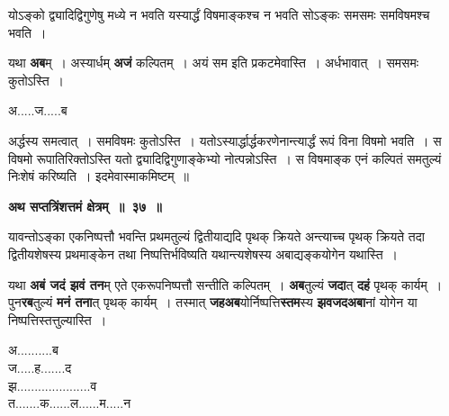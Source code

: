 \documentclass[11pt, openany]{book}
\begin{document}
 {\ab योऽङ्को द्व्यादिद्विगुणेषु मध्ये न भवति यस्यार्द्धं विषमाङ्कश्च न भवति सोऽङ्कः समसमः समविषमश्च भवति~।} 

\newpage
\begin{flushleft}
\begin{minipage}[t]{0.65\textwidth}
\hspace{4mm}  यथा \textbf{अब}म्~। अस्यार्धम् \textbf{अजं} कल्पितम्~। अयं सम इति प्रकटमेवास्ति~। अर्धभावात्~। समसमः कुतोऽस्ति~।
\end{minipage} 
\hfill
\begin{minipage}[t]{0.25\textwidth}
अ.....ज.....ब
\end{minipage}
\end{flushleft}
\vspace{-3mm}
 
\noindent  अर्द्धस्य समत्वात्~। समविषमः कुतोऽस्ति~। यतोऽस्यार्द्धार्द्धकरणेनान्त्यार्द्धं रूपं विना विषमो भवति~। स विषमो रूपातिरिक्तोऽस्ति  यतो द्व्यादिद्विगुणाङ्केभ्यो नोत्पन्नोऽस्ति~। स विषमाङ्क एनं कल्पितं समतुल्यं निःशेषं करिष्यति~। इदमेवास्माकमिष्टम्~॥
\vspace{2mm}

\begin{center}
\textbf{\large अथ सप्तत्रिंशत्तमं क्षेत्रम्~॥~३७~॥ }
\end{center}

{\ab यावन्तोऽङ्का एकनिष्पत्तौ भवन्ति प्रथमतुल्यं द्वितीयाद्यदि पृथक् क्रियते अन्त्याच्च पृथक् क्रियते तदा द्वितीयशेषस्य प्रथमाङ्केन तथा निष्पत्तिर्भविष्यति यथान्त्यशेषस्य अबाद्यङ्कयोगेन यथास्ति~। }

\begin{flushleft}
\begin{minipage}[t]{0.58\textwidth}
\hspace{4mm}  यथा \textbf{अबं जदं झवं तन}म् एते एकरूपनिष्पत्तौ सन्तीति कल्पितम्~। \textbf{अब}तुल्यं \textbf{जदा}त् \textbf{दहं} पृथक् कार्यम्~। पुन\textbf{रब}तुल्यं \textbf{मनं तना}त् पृथक् कार्यम्~। तस्मात् \textbf{जहअब}योर्निष्पत्ति\textbf{स्तम}स्य \textbf{झवजदअबा}नां योगेन या निष्पत्तिस्तत्तुल्यास्ति~।
\end{minipage} 
\hfill
\begin{minipage}[t]{0.32\textwidth}
अ..........ब\\
ज.....ह.......द\\
झ.....................व \\
त.......क......ल......म.....न
\end{minipage}
\end{flushleft}
\vspace{-3mm}
\end{document}
